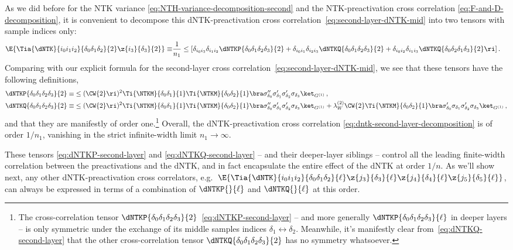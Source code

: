 As we did before for the NTK variance \eqref{eq:NTH-variance-decomposition-second} and the NTK-preactivation cross correlation \eqref{eq:F-and-D-decomposition}, it is convenient to decompose this dNTK-preactivation cross correlation~\eqref{eq:second-layer-dNTK-mid} into two tensors with sample indices only:
\begin{align}\label{eq:dntk-second-layer-decomposition}
\E{\Tia{\dNTK}{i_0i_1i_2}{\delta_0\delta_1\delta_2}{2}\z{i_3}{\delta_3}{2}}\equiv&\frac{1}{n_1}\le[\delta_{i_0 i_3}\delta_{i_1i_2}\dNTKP{\delta_0\delta_1\delta_2\delta_3}{2}+\delta_{i_0i_1}\delta_{i_2i_3}\dNTKQ{\delta_0\delta_1\delta_2\delta_3}{2}+\delta_{i_0i_2}\delta_{i_1i_3}\dNTKQ{\delta_0\delta_2\delta_1\delta_3}{2}\ri]\, .
\end{align}
Comparing with our explicit formula for the second-layer cross correlation~\eqref{eq:second-layer-dNTK-mid}, we see that these tensors have the following definitions,
\begin{align}
\dNTKP{\delta_0\delta_1\delta_2\delta_3}{2}\equiv&\le( \CW{2}\ri)^2 \Ti{\NTKM}{\delta_0\delta_1}{1}\Ti{\NTKM}{\delta_0\delta_2}{1}\bra \sigma''_{\delta_0}\sigma'_{\delta_1}\sigma'_{\delta_2}\sigma_{\delta_3}\ket_{G^{(1)}}\, ,\label{eq:dNTKP-second-layer}\\
\dNTKQ{\delta_0\delta_1\delta_2\delta_3}{2}\equiv&\le( \CW{2}\ri)^2 \Ti{\NTKM}{\delta_0\delta_1}{1}\Ti{\NTKM}{\delta_0\delta_2}{1}\bra \sigma''_{\delta_0}\sigma'_{\delta_1}\sigma'_{\delta_2}\sigma_{\delta_3}\ket_{G^{(1)}} \label{eq:dNTKQ-second-layer}+\lambda_{W}^{(2)}\CW{2}\Ti{\NTKM}{\delta_0\delta_2}{1} \bra \sigma'_{\delta_0}\sigma_{\delta_1}\sigma'_{\delta_2}\sigma_{\delta_3}\ket_{G^{(1)}}\, ,
\end{align}
and that they are manifestly of order one.\footnote{The cross-correlation tensor $\dNTKP{\delta_0\delta_1\delta_2\delta_3}{2}$~\eqref{eq:dNTKP-second-layer} -- and more generally $\dNTKP{\delta_0\delta_1\delta_2\delta_3}{\ell}$ in deeper layers
-- is only symmetric under the exchange of its middle samples indices $\delta_1\leftrightarrow \delta_2$.
Meanwhile, it's manifestly clear from~\eqref{eq:dNTKQ-second-layer} that the other cross-correlation tensor $\dNTKQ{\delta_0\delta_1\delta_2\delta_3}{2}$ has no symmetry whatsoever.} Overall, the dNTK-preactivation cross correlation \eqref{eq:dntk-second-layer-decomposition} is of order $1/n_1$, vanishing in the strict infinite-width limit $n_1 \to \infty$.

These tensors \eqref{eq:dNTKP-second-layer} and \eqref{eq:dNTKQ-second-layer} -- and their deeper-layer siblings -- control all the leading finite-width correlation between the preactivations and the dNTK, and in fact encapsulate the entire effect of the dNTK at order $1/n$. As we'll show next, any other dNTK-preactivation cross correlators, e.g.~$\E{\Tia{\dNTK}{i_0i_1i_2}{\delta_0\delta_1\delta_2}{\ell}\z{j_3}{\delta_3}{\ell}\z{j_4}{\delta_4}{\ell}\z{j_5}{\delta_5}{\ell}}$, can always be expressed in terms of a combination of $\dNTKP{}{\ell}$ and $\dNTKQ{}{\ell}$ at this order. %






